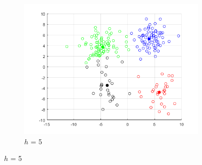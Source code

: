 \documentclass[12pt]{article}
\begin{document}
\begin{figure}[H]
\begin{subfigure}{0.25\textwidth}
  \includegraphics[width=\linewidth]{figs/1-b-meanshift-a.png}
  \caption{$h$ = 5}
  \label{fig:3}
\end{subfigure}


\end{figure}
\end{document}
